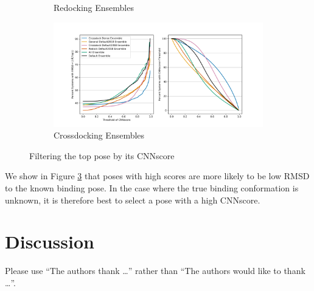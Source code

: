 \documentclass[journal=jcisd8,manuscript=article]{achemso}
\begin{document}
\begin{figure}
\begin{subfigure}[b]{0.48\textwidth}
		\caption{Redocking Ensembles}
		\label{fig:ThreshEnsRD}
        \end{subfigure}    
        \begin{subfigure}[b]{0.48\textwidth}    
		\centering
		\includegraphics[width=\textwidth]{figures/crossdocking/thresh_cnnscore_ensembles.png}
		\caption{Crossdocking Ensembles}
		\label{fig:ThreshEnsRD}
        \end{subfigure}
	\caption{Filtering the top pose by its CNNscore}
	\label{fig:ScoreThresh}
\end{figure} 
We show in Figure \ref{fig:ScoreThresh} that poses with high scores are more likely to be low RMSD to the known binding pose. In the case where the true binding conformation is unknown, it is therefore best to select a pose with a high CNNscore.

\section{Discussion}



\begin{acknowledgement}

Please use ``The authors thank \ldots'' rather than ``The
authors would like to thank \ldots''.



\end{acknowledgement}

\begin{suppinfo}



\end{suppinfo}


\end{document}
